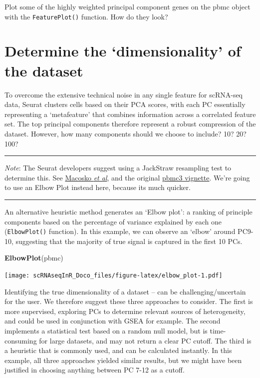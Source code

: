 \documentclass[
]{book}
\newenvironment{Shaded}{\begin{snugshade}}{\end{snugshade}}
\newcommand{\FunctionTok}[1]{\textcolor[rgb]{0.13,0.29,0.53}{\textbf{#1}}}
\newcommand{\NormalTok}[1]{#1}
\begin{document}
Plot some of the highly weighted principal component genes on the pbmc object with the \texttt{FeaturePlot()} function. How do they look?

\hypertarget{determine-the-dimensionality-of-the-dataset}{%
\section{Determine the `dimensionality' of the dataset}\label{determine-the-dimensionality-of-the-dataset}}

To overcome the extensive technical noise in any single feature for scRNA-seq data, Seurat clusters cells based on their PCA scores, with each PC essentially representing a `metafeature' that combines information across a correlated feature set. The top principal components therefore represent a robust compression of the dataset. However, how many components should we choose to include? 10? 20? 100?

\begin{center}\rule{0.5\linewidth}{0.5pt}\end{center}

\emph{Note}: The Seurat developers suggest using a JackStraw resampling test to determine this. See \href{http://www.cell.com/abstract/S0092-8674(15)00549-8}{Macosko \emph{et al}}, and the original \href{https://satijalab.org/seurat/articles/pbmc3k_tutorial.html\#determine-the-dimensionality-of-the-dataset-1}{pbmc3 vignette}. We're going to use an Elbow Plot instead here, because its much quicker.

\begin{center}\rule{0.5\linewidth}{0.5pt}\end{center}

An alternative heuristic method generates an `Elbow plot': a ranking of principle components based on the percentage of variance explained by each one (\texttt{ElbowPlot()} function). In this example, we can observe an `elbow' around PC9-10, suggesting that the majority of true signal is captured in the first 10 PCs.

\begin{Shaded}
\begin{Highlighting}[]
\FunctionTok{ElbowPlot}\NormalTok{(pbmc)}
\end{Highlighting}
\end{Shaded}

\texttt{[image: scRNAseqInR\_Doco\_files/figure-latex/elbow\_plot-1.pdf]}

Identifying the true dimensionality of a dataset -- can be challenging/uncertain for the user. We therefore suggest these three approaches to consider. The first is more supervised, exploring PCs to determine relevant sources of heterogeneity, and could be used in conjunction with GSEA for example. The second implements a statistical test based on a random null model, but is time-consuming for large datasets, and may not return a clear PC cutoff. The third is a heuristic that is commonly used, and can be calculated instantly. In this example, all three approaches yielded similar results, but we might have been justified in choosing anything between PC 7-12 as a cutoff.
\end{document}

